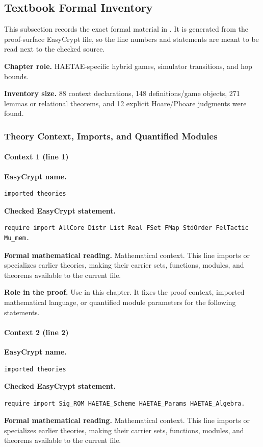 \subsection*{Textbook Formal Inventory}
This subsection records the exact formal material in .  It is generated from the proof-surface EasyCrypt file, so the line numbers and statements are meant to be read next to the checked source.

\noindent\textbf{Chapter role.} HAETAE-specific hybrid games, simulator transitions, and hop bounds.

\noindent\textbf{Inventory size.} 88 context declarations, 148 definitions/game objects, 271 lemmas or relational theorems, and 12 explicit Hoare/Phoare judgments were found.

\subsubsection*{Theory Context, Imports, and Quantified Modules}
\paragraph{Context 1 (line 1)}
\noindent\textbf{EasyCrypt name.}
\begin{lstlisting}[language=EasyCrypt,basicstyle=\ttfamily\scriptsize]
imported theories
\end{lstlisting}
\noindent\textbf{Checked EasyCrypt statement.}
\begin{lstlisting}[language=EasyCrypt,basicstyle=\ttfamily\scriptsize]
require import AllCore Distr List Real FSet FMap StdOrder FelTactic Mu_mem.
\end{lstlisting}
\noindent\textbf{Formal mathematical reading.}
Mathematical context. This line imports or specializes earlier theories, making their carrier sets, functions, modules, and theorems available to the current file.

\noindent\textbf{Role in the proof.}
Use in this chapter. It fixes the proof context, imported mathematical language, or quantified module parameters for the following statements.

\paragraph{Context 2 (line 2)}
\noindent\textbf{EasyCrypt name.}
\begin{lstlisting}[language=EasyCrypt,basicstyle=\ttfamily\scriptsize]
imported theories
\end{lstlisting}
\noindent\textbf{Checked EasyCrypt statement.}
\begin{lstlisting}[language=EasyCrypt,basicstyle=\ttfamily\scriptsize]
require import Sig_ROM HAETAE_Scheme HAETAE_Params HAETAE_Algebra.
\end{lstlisting}
\noindent\textbf{Formal mathematical reading.}
Mathematical context. This line imports or specializes earlier theories, making their carrier sets, functions, modules, and theorems available to the current file.

